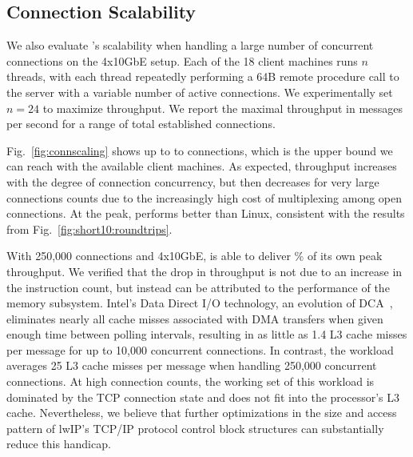 \subsection{Connection Scalability}

\label{sec:eval:scale}

We also evaluate \ix's scalability when handling a large number of
concurrent connections on the 4x10GbE setup. Each of the 18 client
machines runs $n$ threads, with each thread repeatedly performing a
64B remote procedure call to the server with a variable number of
active connections. %
We experimentally set $n=24$ to maximize
throughput.  We report the maximal throughput in messages per second
for a range of total established connections.



Fig.~\ref{fig:connscaling} shows up to to 
connections, which is the upper bound we can reach with the available
client machines.  As expected, throughput increases with the degree of
connection concurrency, but then decreases for very large connections
counts due to the increasingly high cost of multiplexing among open
connections.  At the peak, \ix performs  better than
Linux, consistent with the results from
Fig.~\ref{fig:short10:roundtrips}.

With 250,000 connections and 4x10GbE, \ix is able to deliver
\% of its own peak throughput.  We verified that the drop
in throughput is not due to an increase in the instruction count, but
instead can be attributed to the performance of the memory
subsystem. Intel's Data Direct I/O technology, an evolution of
DCA~\cite{DBLP:conf/isca/HuggahalliIT05}, eliminates nearly all cache
misses associated with DMA transfers when given enough time between
polling intervals, resulting in as little as 1.4 L3 cache misses per
message for up to 10,000 concurrent connections.  In contrast, the
workload averages 25 L3 cache misses per message when handling 250,000
concurrent connections.  At high connection counts, the working set of
this workload is dominated by the TCP connection state and does not
fit into the processor's L3 cache.  Nevertheless, we believe that
further optimizations in the size and access pattern of lwIP's TCP/IP
protocol control block structures can substantially reduce this
handicap.
  



